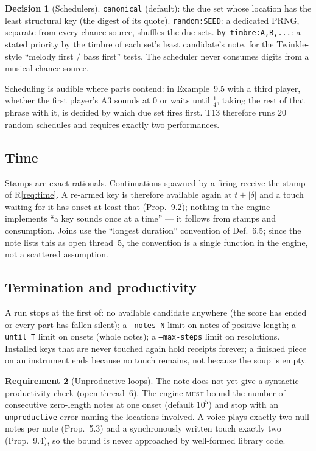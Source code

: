 \documentclass[11pt,a4paper]{article}
\theoremstyle{definition}
\newtheorem{requirement}{Requirement}[section]
\newtheorem{decision}[requirement]{Decision}
\theoremstyle{remark}
\newcommand{\len}[1]{|#1|}
\newcommand{\MUST}{\textsc{must}}
\begin{document}
\begin{decision}[Schedulers]\label{dec:sched}
\texttt{canonical} (default): the due set whose location has the least
structural key (the digest of its quote). \texttt{random:SEED}: a dedicated
PRNG, separate from every chance source, shuffles the due sets.
\texttt{by-timbre:A,B,...}: a stated priority by the timbre of each set's
least candidate's note, for the Twinkle-style ``melody first / bass first''
tests. The scheduler never consumes digits from a musical chance source.
\end{decision}

\noindent Scheduling is audible where parts contend: in Example~9.5 with a
third player, whether the first player's A3 sounds at $0$ or waits until
$\tfrac14$, taking the rest of that phrase with it, is decided by which due set
fires first. T13 therefore runs 20 random schedules and requires exactly two
performances.

\subsection{Time}

Stamps are exact rationals. Continuations spawned by a firing receive the stamp
of R\ref{req:time}. A re-armed key is therefore available again at $t+\len\delta$
and a touch waiting for it has onset at least that (Prop.~9.2); nothing in the
engine implements ``a key sounds once at a time'' --- it follows from stamps and
consumption. Joins use the ``longest duration'' convention of Def.~6.5; since
the note lists this as open thread~5, the convention is a single function in the
engine, not a scattered assumption.

\subsection{Termination and productivity}

A run stops at the first of: no available candidate anywhere (the score has
ended or every part has fallen silent); a \texttt{--notes N} limit on notes of
positive length; a \texttt{--until T} limit on onsets (whole notes); a
\texttt{--max-steps} limit on resolutions. Installed keys that are never touched
again hold receipts forever; a finished piece on an instrument ends because no
touch remains, not because the soup is empty.

\begin{requirement}[Unproductive loops]\label{req:productive}
The note does not yet give a syntactic productivity check (open thread~6). The
engine \MUST{} bound the number of consecutive zero-length notes at one onset
(default $10^5$) and stop with an \texttt{unproductive} error naming the
locations involved. A voice plays exactly two null notes per note (Prop.~5.3)
and a synchronously written touch exactly two (Prop.~9.4), so the bound is never
approached by well-formed library code.
\end{requirement}
\end{document}
